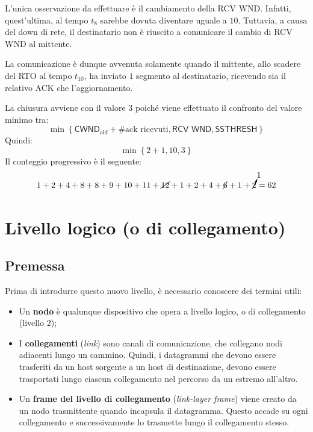 \documentclass[a4paper]{article}
\begin{document}
	\noindent
	L’unica osservazione da effettuare è il cambiamento della \textsf{RCV WND}. Infatti, quest’ultima, al tempo $t_{8}$ sarebbe dovuta diventare uguale a $10$. Tuttavia, a causa del down di rete, il destinatario non è riuscito a comunicare il cambio di \textsf{RCV WND} al mittente.\newline
	
	\noindent
	La comunicazione è dunque avvenuta solamente quando il mittente, allo scadere del \textsf{RTO} al tempo $t_{10}$, ha inviato $1$ segmento al destinatario, ricevendo sia il relativo \textsf{ACK} che l’aggiornamento.\newline
	
	\noindent
	La chiusura avviene con il valore $3$ poiché viene effettuato il confronto del valore minimo tra:
	\begin{equation*}
		\min\left\{\textsf{CWND}_{old} + \text{\#ack ricevuti}, \textsf{RCV WND}, \textsf{SSTHRESH}\right\}
	\end{equation*}
	Quindi:
	\begin{equation*}
		\min\left\{2+1,10,3\right\}
	\end{equation*}
	Il conteggio progressivo è il seguente:
	\begin{equation*}
		1+2+4+8+8+9+10+11+ \cancel{12} +1+2+4+ \cancel{6} +1+ \cancelto{1}{2} =62
	\end{equation*}\newpage
	
	\section{Livello logico (o di collegamento)}\label{livello logico}
	
	\subsection{Premessa}
	
	Prima di introdurre questo nuovo livello, è necessario conoscere dei termini utili:
	\begin{itemize}[label=-]
		\item Un \textbf{nodo} è qualunque dispositivo che opera a livello logico, o di collegamento (livello 2);
		
		\item I \textbf{collegamenti} (\emph{link}) sono canali di comunicazione, che collegano nodi adiacenti lungo un cammino. Quindi, i datagrammi che devono essere trasferiti da un host sorgente a un host di destinazione, devono essere trasportati lungo ciascun collegamento nel percorso da un estremo all’altro.
		
		\item Un \textbf{frame del livello di collegamento} (\emph{link-layer frame}) viene creato da un nodo trasmittente quando incapsula il datagramma. Questo accade su ogni collegamento e successivamente lo trasmette lungo il collegamento stesso.
	\end{itemize}
\end{document}
